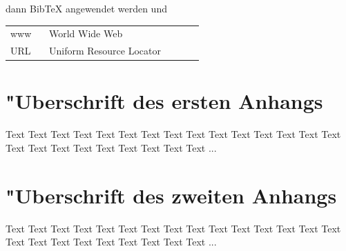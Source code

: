 \documentclass[a4paper,bibtotoc,oneside]{scrbook}
\begin{document}

dann BibTeX angewendet werden und




\listoffigures
{} %
\newpage

\listoftables
{} %
\newpage

\hspace{-17mm}\begin{tabular}{>{\raggedleft}p{0.2\linewidth} p{0.75\linewidth} p{0.1\linewidth}}
www & World Wide Web \\
URL & Uniform Resource Locator
\end{tabular}

\begin{appendix}
\chapter[Erster Anhang]{"Uberschrift des ersten Anhangs}

Text Text Text Text Text Text Text Text Text Text Text Text Text Text Text Text Text Text Text Text Text Text Text Text ...


\chapter[Zweiter Anhang]{"Uberschrift des zweiten Anhangs}

Text Text Text Text Text Text Text Text Text Text Text Text Text Text Text Text Text Text Text Text Text Text Text Text ...

\end{appendix}
\end{document}
